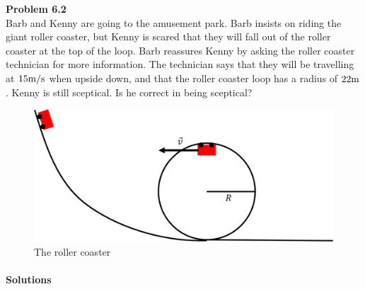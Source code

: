 \begin{framed}
\textbf{Problem 6.2}\\
Barb and Kenny are going to the amusement park. Barb insists on riding the giant roller coaster, but Kenny is scared that they will fall out of the roller coaster at the top of the loop. Barb reassures Kenny by asking the roller coaster technician for more information. The technician says that they will be travelling at $15 {\rm m/s}$ when upside down, and that the roller coaster loop has a radius of $22 {\rm m}$. Kenny is still sceptical. Is he correct in being sceptical?

\begin{figure}[!htbp]
\centering
\includegraphics[width=0.6\linewidth]{files/rollercoaster-fcc6a55ec109e24ec90fcc064e2b34a0.png}
\caption[]{The roller coaster}
\label{fig:applyingnewtonslaws:rollercoaster}
\end{figure}
\end{framed}

\paragraph{Solutions}

